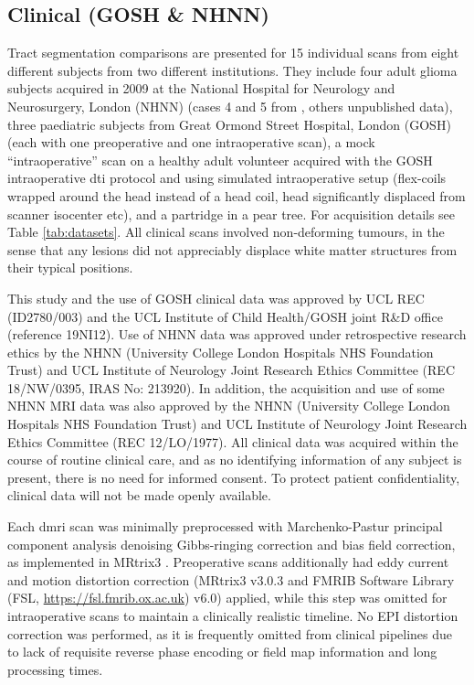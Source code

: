 \subsection{Clinical (GOSH \& NHNN)}

Tract segmentation comparisons are presented for 15 individual scans from eight different subjects from two different institutions.
They include four adult glioma subjects acquired in 2009 at the National Hospital for Neurology and Neurosurgery, London (NHNN) (cases 4 and 5 from \textcite{Mancini2022}, others unpublished data),
three paediatric subjects from Great Ormond Street Hospital, London (GOSH) (each with one preoperative and one intraoperative scan),
a mock “intraoperative” scan on a healthy adult volunteer acquired with the GOSH intraoperative \gls{dti} protocol and using simulated intraoperative setup (flex-coils wrapped around the head instead of a head coil, head significantly displaced from scanner isocenter etc),
and a partridge in a pear tree.
For acquisition details see Table \ref{tab:datasets}.
All clinical scans involved non-deforming tumours, in the sense that any lesions did not appreciably displace white matter structures from their typical positions.

This study and the use of GOSH clinical data was approved by UCL REC (ID2780/003) and the UCL Institute of Child Health/GOSH joint R\&D office (reference 19NI12).
Use of NHNN data was approved under retrospective research ethics by the NHNN (University College London Hospitals NHS Foundation Trust) and UCL Institute of Neurology Joint Research Ethics Committee (REC 18/NW/0395, IRAS No: 213920).
In addition, the acquisition and use of some NHNN MRI data was also approved by the NHNN (University College London Hospitals NHS Foundation Trust) and UCL Institute of Neurology Joint Research Ethics Committee (REC 12/LO/1977).
All clinical data was acquired within the course of routine clinical care, and as no identifying information of any subject is present, there is no need for informed consent.
To protect patient confidentiality, clinical data will not be made openly available.

Each \gls{dmri} scan was minimally preprocessed with Marchenko-Pastur principal component analysis denoising\autocite{Veraart2016, Cordero-Grande2019} Gibbs-ringing correction\autocite{Kellner2016} and bias field correction,\autocite{Zhang2001, Smith2004} as implemented in MRtrix3 \autocite{Tournier2019}.
Preoperative scans additionally had eddy current and motion distortion correction\autocite{Andersson2016a, Smith2004} (MRtrix3 v3.0.3 and FMRIB Software Library (FSL, \url{https://fsl.fmrib.ox.ac.uk}) v6.0) applied, while this step was omitted for intraoperative scans to maintain a clinically realistic timeline.
No EPI distortion correction was performed, as it is frequently omitted from clinical pipelines due to lack of requisite reverse phase encoding or field map information and long processing times.\autocite{Yang2022}

